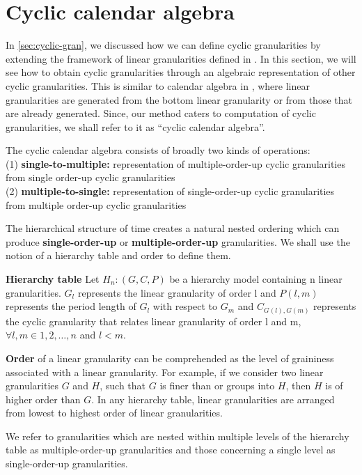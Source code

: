 \documentclass[12pt]{article}
\begin{document}
\hypertarget{sec:cyclic-calendar}{%
\section{Cyclic calendar algebra}\label{sec:cyclic-calendar}}

In \autoref{sec:cyclic-gran}, we discussed how we can define cyclic granularities by extending the framework of linear granularities defined in \citet{Bettini1998-ed}. In this section, we will see how to obtain cyclic granularities through an algebraic representation of other cyclic granularities. This is similar to calendar algebra in \citet{Ning2002-tf}, where linear granularities are generated from the bottom linear granularity or from those that are already generated. Since, our method caters to computation of cyclic granularities, we shall refer to it as ``cyclic calendar algebra''.

The cyclic calendar algebra consists of broadly two kinds of operations:\\
(1) \textbf{single-to-multiple:} representation of multiple-order-up cyclic granularities from single order-up cyclic granularities\\
(2) \textbf{multiple-to-single:} representation of single-order-up cyclic granularities from multiple order-up cyclic granularities

The hierarchical structure of time creates a natural nested ordering which can produce \textbf{single-order-up} or \textbf{multiple-order-up} granularities. We shall use the notion of a hierarchy table and order to define them.

\textbf{Hierarchy table} Let \(H_n: (G, C, P)\) be a hierarchy model containing n linear granularities. \(G_{l}\) represents the linear granularity of order l and \(P(l,m)\) represents the period length of \(G_{l}\) with respect to \(G_{m}\) and \(C_{G(l),G(m)}\) represents the cyclic granularity that relates linear granularity of order l and m, \(\forall l,m \in {1, 2, \dots,n}\) and \(l<m\).

\textbf{Order} of a linear granularity can be comprehended as the level of graininess associated with a linear granularity. For example, if we consider two linear granularities \(G\) and \(H\), such that \(G\) is finer than or groups into \(H\), then \(H\) is of higher order than \(G\). In any hierarchy table, linear granularities are arranged from lowest to highest order of linear granularities.

We refer to granularities which are nested within multiple levels of the hierarchy table as multiple-order-up granularities and those concerning a single level as single-order-up granularities.
\end{document}
